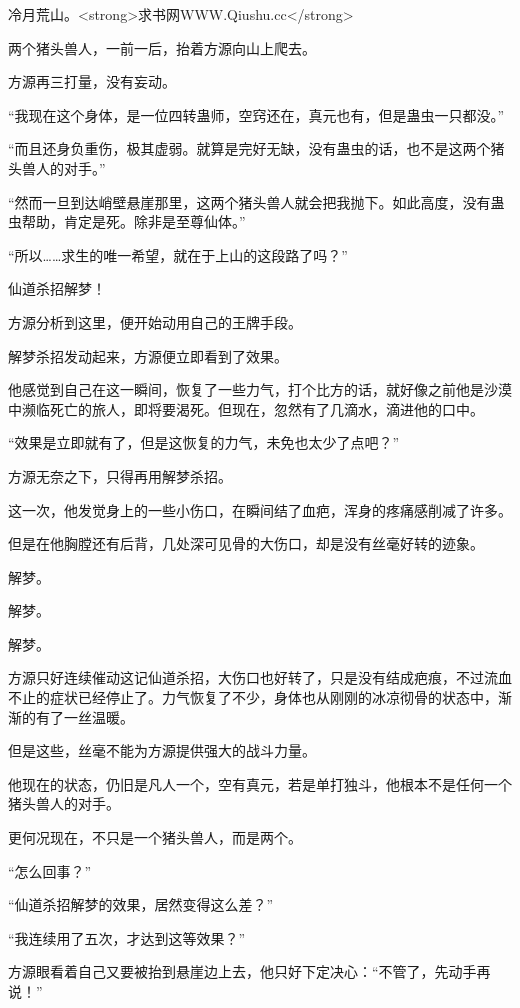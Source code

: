
\begin{this_body}

冷月荒山。<strong>求书网WWW.Qiushu.cc</strong>

两个猪头兽人，一前一后，抬着方源向山上爬去。

方源再三打量，没有妄动。

“我现在这个身体，是一位四转蛊师，空窍还在，真元也有，但是蛊虫一只都没。”

“而且还身负重伤，极其虚弱。就算是完好无缺，没有蛊虫的话，也不是这两个猪头兽人的对手。”

“然而一旦到达峭壁悬崖那里，这两个猪头兽人就会把我抛下。如此高度，没有蛊虫帮助，肯定是死。除非是至尊仙体。”

“所以……求生的唯一希望，就在于上山的这段路了吗？”

仙道杀招解梦！

方源分析到这里，便开始动用自己的王牌手段。

解梦杀招发动起来，方源便立即看到了效果。

他感觉到自己在这一瞬间，恢复了一些力气，打个比方的话，就好像之前他是沙漠中濒临死亡的旅人，即将要渴死。但现在，忽然有了几滴水，滴进他的口中。

“效果是立即就有了，但是这恢复的力气，未免也太少了点吧？”

方源无奈之下，只得再用解梦杀招。

这一次，他发觉身上的一些小伤口，在瞬间结了血疤，浑身的疼痛感削减了许多。

但是在他胸膛还有后背，几处深可见骨的大伤口，却是没有丝毫好转的迹象。

解梦。

解梦。

解梦。

方源只好连续催动这记仙道杀招，大伤口也好转了，只是没有结成疤痕，不过流血不止的症状已经停止了。力气恢复了不少，身体也从刚刚的冰凉彻骨的状态中，渐渐的有了一丝温暖。

但是这些，丝毫不能为方源提供强大的战斗力量。

他现在的状态，仍旧是凡人一个，空有真元，若是单打独斗，他根本不是任何一个猪头兽人的对手。

更何况现在，不只是一个猪头兽人，而是两个。

“怎么回事？”

“仙道杀招解梦的效果，居然变得这么差？”

“我连续用了五次，才达到这等效果？”

方源眼看着自己又要被抬到悬崖边上去，他只好下定决心：“不管了，先动手再说！”


\end{this_body}

